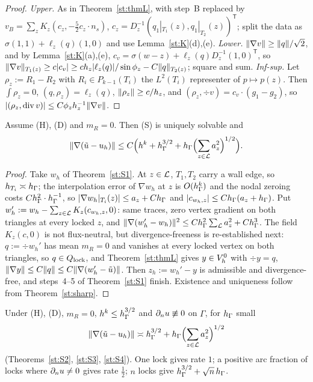 \begin{proof}
\emph{Upper.} As in Theorem~\ref{st:thmL}, with step~B replaced by $v_B=\sum_zK_z(c_z,-\frac52c_z\cdot n_s)$, $c_z=D_z^{-1}(q_1|_{T_1}(z),q_1|_{T_2}(z))^{\mathsf T}$; split the data as $\sigma(1,1)+\ell_z(q)(1,0)$ and use Lemma~\ref{st:K}(d),(e).
\emph{Lower.} $\lVert \nabla v\rVert\ge\lVert q\rVert/\sqrt2$, and by Lemma~\ref{st:K}(a),(e), $c_v=\sigma(w-z)+\ell_z(q)D_z^{-1}(1,0)^{\mathsf T}$, so $\lVert \nabla v\rVert_{T_1(z)}\ge c|c_v|\ge ch_z|\ell_z(q)|/\sin\phi_z-C\lVert q\rVert_{T_2(z)}$; square and sum.
\emph{Inf-sup.} Let $\rho_z:=R_1-R_2$ with $R_i\in P_{k-1}(T_i)$ the $L^2(T_i)$ representer of $p\mapsto p(z)$. Then $\int\rho_z=0$, $(q,\rho_z)=\ell_z(q)$, $\lVert \rho_z\rVert\ge c/h_z$, and $(\rho_z,\div v)=c_v\cdot(g_1-g_2)$, so $|(\rho_z,\operatorname{div} v)|\le C\phi_zh_z^{-1}\lVert \nabla v\rVert$.
\end{proof}

\begin{theorem}\label{st:S4}
Assume (H), (D) and $m_R=0$. Then (S) is uniquely solvable and
\[
\lVert \nabla(\tilde u-u_h)\rVert\le C\Bigl(h^k+h_\Gamma^{3/2}+h_\Gamma\Bigl(\sum_{z\in\mathcal L}a_z^2\Bigr)^{1/2}\Bigr).
\]
\end{theorem}

\begin{proof}
Take $w_h$ of Theorem~\ref{st:S1}. At $z\in\mathcal L$, $T_1,T_2$ carry a wall edge, so $h_{T_i}\asymp h_\Gamma$; the interpolation error of $\nabla w_h$ at $z$ is $O(h_\Gamma^k)$ and the nodal zeroing costs $Ch_\Gamma^2\cdot h_\Gamma^{-1}$, so $|\nabla w_h|_{T_i}(z)|\le a_z+Ch_\Gamma$ and $|c_{w_h,z}|\le Ch_\Gamma(a_z+h_\Gamma)$. Put $w_h':=w_h-\sum_{z\in\mathcal L}K_z(c_{w_h,z},0)$: same traces, zero vertex gradient on both triangles at every locked $z$, and $\lVert \nabla(w_h'-w_h)\rVert^2\le Ch_\Gamma^2\sum_{\mathcal L}a_z^2+Ch_\Gamma^3$. The field $K_z(c,0)$ is not flux-neutral, but divergence-freeness is re-established next: $q:=\div w_h'$ has mean $m_R=0$ and vanishes at every locked vertex on both triangles, so $q\in Q_{\mathrm{lock}}$, and Theorem~\ref{st:thmL} gives $y\in V_h^0$ with $\div y=q$, $\lVert \nabla y\rVert\le C\lVert q\rVert\le C\lVert \nabla(w_h'-\tilde u)\rVert$. Then $z_h:=w_h'-y$ is admissible and divergence-free, and steps~4--5 of Theorem~\ref{st:S1} finish. Existence and uniqueness follow from Theorem~\ref{st:sharp}.
\end{proof}

\begin{corollary}\label{st:two}
Under (H), (D), $m_R=0$, $h^k\le h_\Gamma^{3/2}$ and $\partial_n u\not\equiv0$ on $\Gamma$, for $h_\Gamma$ small
\[
\lVert \nabla(\tilde u-u_h)\rVert\asymp h_\Gamma^{3/2}+h_\Gamma\Bigl(\sum_{z\in\mathcal L}a_z^2\Bigr)^{1/2}
\]
(Theorems~\ref{st:S2}, \ref{st:S3}, \ref{st:S4}). One lock gives rate $1$; a positive arc fraction of locks where $\partial_n u\ne0$ gives rate $\frac12$; $n$ locks give $h_\Gamma^{3/2}+\sqrt n\,h_\Gamma$.
\end{corollary}


